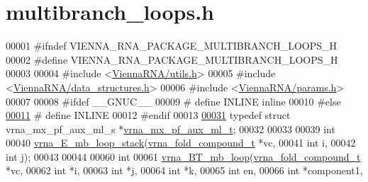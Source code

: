 \hypertarget{multibranch__loops_8h_source}{}\section{multibranch\+\_\+loops.\+h}
\label{multibranch__loops_8h_source}

\begin{DoxyCode}
00001 \textcolor{preprocessor}{#ifndef VIENNA\_RNA\_PACKAGE\_MULTIBRANCH\_LOOPS\_H}
00002 \textcolor{preprocessor}{#define VIENNA\_RNA\_PACKAGE\_MULTIBRANCH\_LOOPS\_H}
00003 
00004 \textcolor{preprocessor}{#include <\mbox{\hyperlink{utils_8h}{ViennaRNA/utils.h}}>}
00005 \textcolor{preprocessor}{#include <\mbox{\hyperlink{data__structures_8h}{ViennaRNA/data\_structures.h}}>}
00006 \textcolor{preprocessor}{#include <\mbox{\hyperlink{params_8h}{ViennaRNA/params.h}}>}
00007 
00008 \textcolor{preprocessor}{#ifdef \_\_GNUC\_\_}
00009 \textcolor{preprocessor}{# define INLINE inline}
00010 \textcolor{preprocessor}{#else}
\mbox{\hyperlink{multibranch__loops_8h_a2eb6f9e0395b47b8d5e3eeae4fe0c116}{00011}} \textcolor{preprocessor}{# define INLINE}
00012 \textcolor{preprocessor}{#endif}
00013 
\mbox{\hyperlink{group__loops_ga39a8cc1385dcb542a60a9393cde6a1e3}{00031}} \textcolor{keyword}{typedef} \textcolor{keyword}{struct }vrna\_mx\_pf\_aux\_ml\_s *\mbox{\hyperlink{group__loops_ga39a8cc1385dcb542a60a9393cde6a1e3}{vrna\_mx\_pf\_aux\_ml\_t}};
00032 
00033 
00039 \textcolor{keywordtype}{int}
00040 \mbox{\hyperlink{group__loops_ga73f048d35475e1d8f50b7d4ac6a2aeb6}{vrna\_E\_mb\_loop\_stack}}(\mbox{\hyperlink{group__fold__compound_structvrna__fc__s}{vrna\_fold\_compound\_t}} *vc,
00041                      \textcolor{keywordtype}{int}                  i,
00042                      \textcolor{keywordtype}{int}                  j);
00043 
00044 
00060 \textcolor{keywordtype}{int}
00061 \mbox{\hyperlink{group__loops_ga9cb520ddfd8b3a48089a7910b045d06b}{vrna\_BT\_mb\_loop}}(\mbox{\hyperlink{group__fold__compound_structvrna__fc__s}{vrna\_fold\_compound\_t}}  *vc,
00062                 \textcolor{keywordtype}{int}                   *i,
00063                 \textcolor{keywordtype}{int}                   *j,
00064                 \textcolor{keywordtype}{int}                   *k,
00065                 \textcolor{keywordtype}{int}                   en,
00066                 \textcolor{keywordtype}{int}                   *component1,

\end{DoxyCode}

